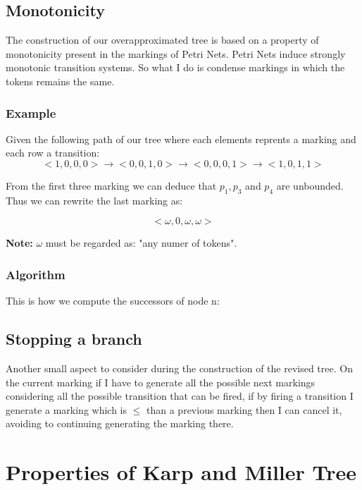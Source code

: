 \subsection{Monotonicity}
The construction of our overapproximated tree is based on a property of monotonicity present in the markings of Petri Nets. Petri Nets induce strongly monotonic transition systems. So what I do is condense markings in which the tokens remains the same.

\subsubsection{Example}
Given the following path of our tree where each elements reprents a marking and each row a transition:
\begin{equation*}
    <1, 0, 0, 0> \rightarrow <0, 0, 1, 0> \rightarrow <0, 0, 0, 1> \rightarrow <1, 0, 1, 1>
\end{equation*}

From the first three marking we can deduce that $p_{1}, p_{3}$ and $p_{4}$ are unbounded. Thus we can rewrite the last marking as:

\begin{equation*}
    <\omega, 0, \omega, \omega>
\end{equation*}

\textbf{Note:} $\omega$ must be regarded as: "any numer of tokens".

\subsubsection{Algorithm}
This is how we compute the successors of node n:


\subsection{Stopping a branch}
Another small aspect to consider during the construction of the revised tree. On the current marking if I have to generate all the possible next markings considering all the possible transition that can be fired, if by firing a transition I generate a marking which is $\leq$ than a previous marking then I can cancel it, avoiding to continuing generating the marking there.


\section{Properties of Karp and Miller Tree}

